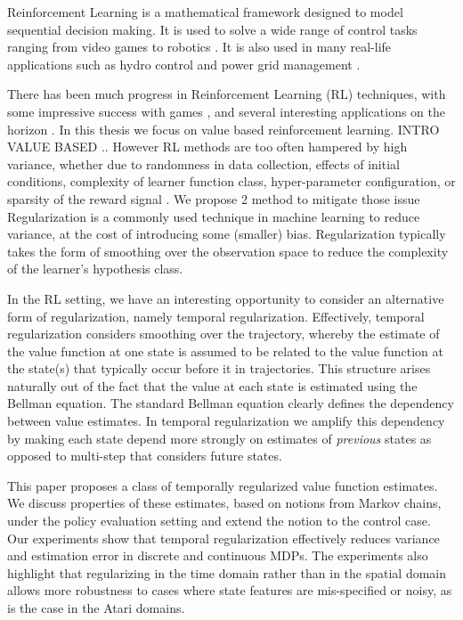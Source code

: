 
Reinforcement Learning is a mathematical framework designed to model sequential decision making. It is used to solve a wide range of control tasks ranging from video games \cite{vinyals2017starcraft,mnih2013playing,mnih2016asynchronous} to robotics \cite{kober2013reinforcement,abbeel2010autonomous}. It is also used in many real-life applications such as hydro control \cite{grinberg2014optimizing} and power grid management \cite{franccois2016deep}.


There has been much progress in Reinforcement Learning (RL) techniques, with some impressive success with games \cite{silver16}, and several interesting applications on the horizon \cite{koedinger18,shortreed11,prasad17,dhingra17}. In this thesis we focus on value based reinforcement learning. 
INTRO VALUE BASED ..
However RL methods are too often hampered by high variance, whether due to randomness in data collection, effects of initial conditions, complexity of learner function class, hyper-parameter configuration, or sparsity of the reward signal \cite{henderson2017deep}.
We propose 2 method to mitigate those issue
Regularization is a commonly used technique in machine learning to reduce variance, at the cost of introducing some (smaller) bias.  Regularization typically takes the form of smoothing over the observation space to reduce the complexity of the learner's hypothesis class.

In the RL setting, we have an interesting opportunity to consider an alternative form of regularization, namely temporal regularization.  Effectively, temporal regularization considers smoothing over the trajectory, whereby the estimate of the value function at one state is assumed to be related to the value function at the state(s) that typically occur before it in trajectories. This structure arises naturally out of the fact that the value at each state is estimated using the Bellman equation. The standard Bellman equation clearly defines the dependency between value estimates. In temporal regularization we amplify this dependency by making each state depend more strongly on estimates of \emph{previous} states as opposed to multi-step that considers future states. 

This paper proposes a class of temporally regularized value function estimates. We discuss properties of these estimates, based on notions from Markov chains, under the policy evaluation setting and extend the notion to the control case.
Our experiments show that temporal regularization effectively reduces variance and estimation error in discrete and continuous MDPs.  The experiments also highlight that regularizing in the time domain rather than in the spatial domain allows more robustness to cases where state features are mis-specified or noisy, as is the case in the Atari domains.


